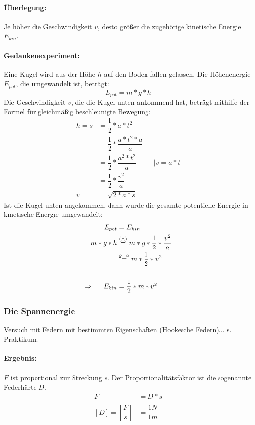 	\paragraph{Überlegung:}
	Je höher die Geschwindigkeit $ v $, desto größer die zugehörige kinetische Energie $ E_{kin} $.
	\paragraph{Gedankenexperiment:} Eine Kugel wird aus der Höhe $ h $ auf den Boden fallen gelassen. Die Höhenenergie $ E_{pot} $, die umgewandelt ist, beträgt:
	\begin{equation}
		E_{pot} = m*g*h
	\end{equation}
	Die Geschwindigkeit $ v $, die die Kugel unten ankommend hat, beträgt mithilfe der Formel für gleichmäßig beschleunigte Bewegung:
	\begin{align}
		h = s &= \dfrac{1}{2}*a*t^2\\
		&= \dfrac{1}{2}*\dfrac{a*t^2*a}{a}\\
		&= \dfrac{1}{2}*\dfrac{a^2*t^2}{a} && |v=a*t\\
		&= \dfrac{1}{2}*\dfrac{v^2}{a}\\
		v &= \sqrt{2*a*s}
	\end{align}
	Ist die Kugel unten angekommen, dann wurde die gesamte potentielle Energie in kinetische Energie umgewandelt:
	\begin{align}
		E_{pot} &= E_{kin}\\
		m*g*h &\stackrel{(\wedge)}{=} m*g*\dfrac{1}{2}*\dfrac{v^2}{a}\\
		&\stackrel{g=a}{=} m*\dfrac{1}{2}*v^2\\
		\nonumber\\
		\Rightarrow\hspace{0.5cm} E_{kin} &= \dfrac{1}{2}*m*v^2
	\end{align}
	
	\subsubsection{Die Spannenergie}
	Versuch mit Federn mit bestimmten Eigenschaften (Hookesche Federn)... s. Praktikum.
	\paragraph{Ergebnis:}
	$ F $ ist proportional zur Streckung $ s $. Der Proportionalitätsfaktor ist die sogenannte Federhärte $ D $.
	\begin{align}
		F &= D*s\\
		\nonumber\\
		[D] = \left[\dfrac{F}{s}\right] &= \dfrac{1N}{1m}
	\end{align}
